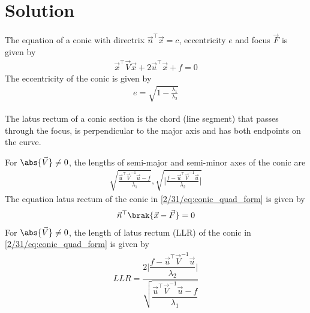 \documentclass[journal,12pt,twocolumn]{IEEEtran}
\begin{document}
\section{Solution}
The equation of a conic with directrix $\vec{n}^{\top}\vec{x} = c$, eccentricity $e$ and focus $\vec{F}$ is given by 
\begin{align}
    \label{2/31/eq:conic_quad_form}
    \vec{x}^{\top}\vec{V}\vec{x}+2\vec{u}^{\top}\vec{x}+f=0
    \end{align}
The eccentricity of the conic  is given by
\begin{align}
e= \sqrt{1-\frac{\lambda_1}{\lambda_2}}
\label{2/31/eq:e}
\end{align}
\begin{definition}
The latus rectum of a conic section is the chord (line segment) that passes through the focus, is perpendicular to the major axis and has both endpoints on the curve.
\end{definition}
For $\abs{\vec{V}} \ne 0$, the lengths of semi-major and semi-minor axes of the conic  are 
\begin{align} 
\sqrt{\frac{\vec{u}^{\top}\vec{V}^{-1}\vec{u} -f}{\lambda_1}}, 
\sqrt{\bigg | \frac{f-\vec{u}^{\top}\vec{V}^{-1}\vec{u}}{\lambda_2}\bigg | }
\label{2/31/eq:ab}
\end{align} 
The equation latus rectum of the conic in \eqref{2/31/eq:conic_quad_form} is given by
\begin{align}
    \vec{n}^{\top}\brak{\vec{x}-\vec{F}} = 0
    \label{2/31/eq:lreq}
\end{align}
For $\abs{\vec{V}} \ne 0$, the length of latus rectum (LLR) of the conic in \eqref{2/31/eq:conic_quad_form} is given by 
\begin{align} 
LLR=\dfrac{2\bigg | \dfrac{f-\vec{u}^{\top}\vec{V}^{-1}\vec{u}}{\lambda_2}\bigg | }{{\sqrt{\dfrac{\vec{u}^{\top}\vec{V}^{-1}\vec{u} -f}{\lambda_1}}}}
\label{2/31/eq:LLR}
\end{align} 
\end{document}
